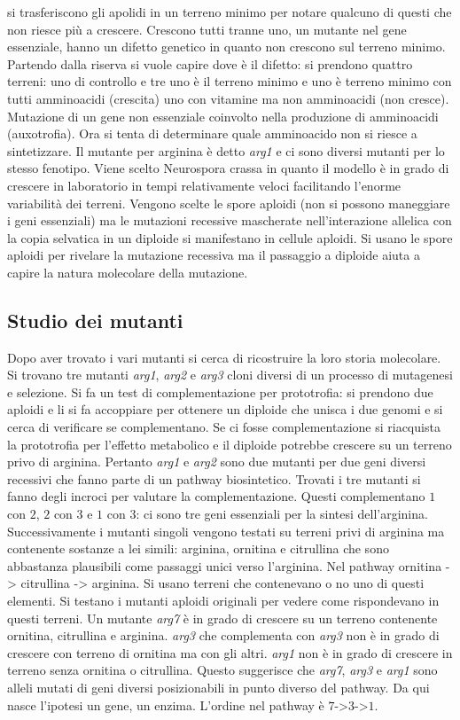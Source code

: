si trasferiscono gli apolidi in un terreno minimo per notare qualcuno di questi che non riesce pi\`u a crescere. Crescono tutti tranne uno, un mutante nel gene essenziale, hanno un
difetto genetico in quanto non crescono sul terreno minimo. Partendo dalla riserva si vuole capire dove \`e il difetto: si prendono quattro terreni: uno di controllo e tre uno \`e
il terreno minimo  e uno \`e terreno minimo con tutti amminoacidi (crescita) uno con vitamine ma non amminoacidi (non cresce). Mutazione di un gene non essenziale coinvolto nella
produzione di amminoacidi (auxotrofia). Ora si tenta di determinare quale amminoacido non si riesce a sintetizzare. Il mutante per arginina \`e detto \emph{arg1} e ci sono diversi 
mutanti per lo stesso fenotipo. Viene scelto Neurospora crassa in quanto il modello \`e in grado di crescere in laboratorio in tempi relativamente veloci facilitando l'enorme
variabilit\`a dei terreni. Vengono scelte le spore aploidi (non si possono maneggiare i geni essenziali) ma le mutazioni recessive mascherate nell'interazione allelica con la copia
selvatica in un diploide si manifestano in cellule aploidi. Si usano le spore aploidi per rivelare la mutazione recessiva ma il passaggio a diploide aiuta a capire la natura 
molecolare della mutazione.
\subsection{Studio dei mutanti}
Dopo aver trovato i vari mutanti si cerca di ricostruire la loro storia molecolare. Si trovano tre mutanti \emph{arg1}, \emph{arg2} e \emph{arg3} cloni diversi di un processo di 
mutagenesi e selezione. Si fa un test di complementazione per prototrofia: si prendono due aploidi e li si fa accoppiare per ottenere un diploide che unisca i due genomi e si 
cerca di verificare se complementano. Se ci fosse complementazione si riacquista la prototrofia per l'effetto metabolico e il diploide potrebbe crescere su un terreno privo di 
arginina. Pertanto \emph{arg1} e \emph{arg2} sono due mutanti per due geni diversi recessivi che fanno parte di un pathway biosintetico. Trovati i tre mutanti si fanno degli incroci
per valutare la complementazione. Questi complementano $1$ con $2$, $2$ con $3$ e $1$ con $3$: ci sono tre geni essenziali per la sintesi dell'arginina. Successivamente i mutanti 
singoli vengono testati su terreni privi di arginina ma contenente sostanze a lei simili: arginina, ornitina e citrullina che sono abbastanza plausibili come passaggi unici verso 
l'arginina. Nel pathway ornitina -> citrullina -> arginina. Si usano terreni che contenevano o no uno di questi elementi. Si testano i mutanti aploidi originali per vedere come
rispondevano in questi terreni. Un mutante \emph{arg7} \`e in grado di crescere su un terreno contenente ornitina, citrullina e arginina. \emph{arg3} che complementa con \emph{arg3}
non \`e in grado di crescere con terreno di ornitina ma con gli altri. \emph{arg1} non \`e in grado di crescere in terreno senza ornitina o citrullina. Questo suggerisce che
\emph{arg7}, \emph{arg3} e \emph{arg1} sono alleli mutati di geni diversi posizionabili in punto diverso del pathway. Da qui nasce l'ipotesi un gene, un enzima. L'ordine nel 
pathway \`e $7$->$3$->$1$.
